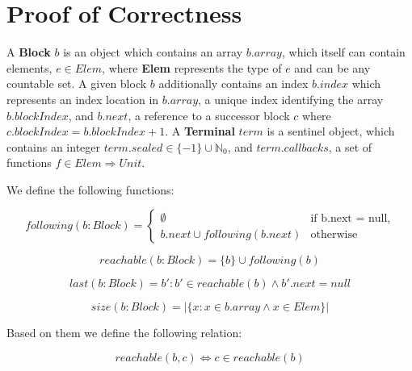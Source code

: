\documentclass[runningheads,a4paper]{llncs}
\begin{document}
\section{Proof of Correctness}


\setcounter{lemma}{0}
\setcounter{theorem}{0}
\setcounter{corollary}{0}
\setcounter{definition}{0}




\begin{definition}
A \textbf{Block} $b$ is an object which
contains an array $b.array$, which itself can contain elements, $e \in Elem$,
where \textbf{Elem} represents the type of $e$ and can be any countable set. A
given block $b$ additionally contains an index $b.index$ which represents an
index location in $b.array$, a unique index identifying the array
$b.blockIndex$, and $b.next$, a reference to a successor block $c$ where
$c.blockIndex = b.blockIndex + 1$. A \textbf{Terminal} $term$ is a sentinel
object, which contains an integer $term.sealed \in \{-1\} \cup \mathbb{N}_0$, and
$term.callbacks$, a set of functions $f \in Elem \Rightarrow Unit$.

We define the following functions:

\begin{equation*}
following(b: Block) = 
\begin{cases}
\emptyset & \text{if b.next = null,}
\\
b.next \cup following(b.next) & \text{otherwise}
\end{cases}
\end{equation*}

\begin{equation*}
reachable(b: Block) = \{ b \} \cup following(b)
\end{equation*}

\begin{equation*}
last(b: Block) = b' : b' \in reachable(b) \wedge b'.next = null
\end{equation*}

\begin{equation*}
size(b: Block) = | \{ x : x \in b.array \wedge x \in Elem \} |
\end{equation*}

Based on them we define the following relation:

\begin{equation*}
reachable(b, c) \Leftrightarrow c \in reachable(b)
\end{equation*}
\end{definition}
\end{document}
